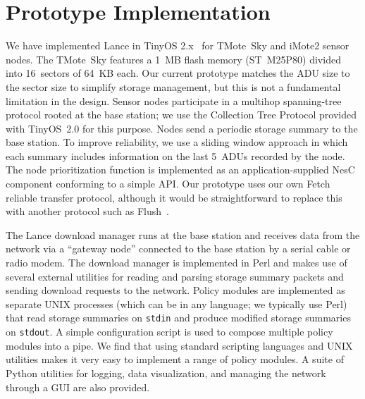 \section{Prototype Implementation}
\label{sec-implementation}
\label{sec-implementation-nsm}

We have implemented Lance in TinyOS 2.x~\cite{tinyos-asplos00} for 
TMote~Sky and iMote2 sensor nodes. The TMote~Sky features a
1~MB flash memory (ST~M25P80) divided into 16~sectors of 64~KB each.
Our current prototype matches the ADU size to the sector size to
simplify storage management, but this is not a fundamental limitation
in the design. Sensor nodes participate in a multihop spanning-tree 
protocol rooted
at the base station; we use the Collection Tree Protocol provided with
TinyOS~2.0 for this purpose. Nodes send a periodic storage summary to the
base station. To improve reliability, we use a
sliding window approach in which each summary includes information on
the last 5~ADUs recorded by the node. The node prioritization function
is implemented as an application-supplied NesC component conforming to
a simple API. Our prototype uses our own Fetch~\cite{volcano-osdi06}
reliable transfer protocol, although it would be straightforward to
replace this with another protocol such as Flush~\cite{flush-sensys07}.

The Lance download manager runs at the base station and receives
data from the network via a ``gateway node'' connected to the base
station by a serial cable or radio modem.  The download manager is 
implemented in Perl and makes use of several external utilities for
reading and parsing storage summary packets and sending download
requests to the network. Policy modules are implemented as separate
UNIX processes (which can be in any language; we typically use Perl) 
that read storage summaries on {\tt stdin} and produce modified
storage summaries on {\tt stdout}. A simple configuration script is
used to compose multiple policy modules into a pipe. We find that
using standard scripting languages and UNIX utilities makes it very
easy to implement a range of policy modules.
A suite of Python utilities for logging, data visualization, and 
managing the network through a GUI are also provided.
